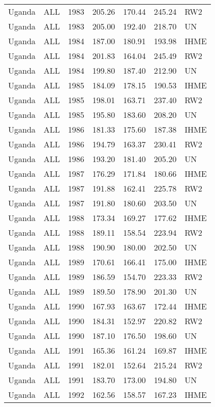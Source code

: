 \begin{longtable}{lllrrrl}
  Uganda & ALL & 1983 & 205.26 & 170.44 & 245.24 & RW2 \\ 
  Uganda & ALL & 1983 & 205.00 & 192.40 & 218.70 & UN \\ 
  Uganda & ALL & 1984 & 187.00 & 180.91 & 193.98 & IHME \\ 
  Uganda & ALL & 1984 & 201.83 & 164.04 & 245.49 & RW2 \\ 
  Uganda & ALL & 1984 & 199.80 & 187.40 & 212.90 & UN \\ 
  Uganda & ALL & 1985 & 184.09 & 178.15 & 190.53 & IHME \\ 
  Uganda & ALL & 1985 & 198.01 & 163.71 & 237.40 & RW2 \\ 
  Uganda & ALL & 1985 & 195.80 & 183.60 & 208.20 & UN \\ 
  Uganda & ALL & 1986 & 181.33 & 175.60 & 187.38 & IHME \\ 
  Uganda & ALL & 1986 & 194.79 & 163.37 & 230.41 & RW2 \\ 
  Uganda & ALL & 1986 & 193.20 & 181.40 & 205.20 & UN \\ 
  Uganda & ALL & 1987 & 176.29 & 171.84 & 180.66 & IHME \\ 
  Uganda & ALL & 1987 & 191.88 & 162.41 & 225.78 & RW2 \\ 
  Uganda & ALL & 1987 & 191.80 & 180.60 & 203.50 & UN \\ 
  Uganda & ALL & 1988 & 173.34 & 169.27 & 177.62 & IHME \\ 
  Uganda & ALL & 1988 & 189.11 & 158.54 & 223.94 & RW2 \\ 
  Uganda & ALL & 1988 & 190.90 & 180.00 & 202.50 & UN \\ 
  Uganda & ALL & 1989 & 170.61 & 166.41 & 175.00 & IHME \\ 
  Uganda & ALL & 1989 & 186.59 & 154.70 & 223.33 & RW2 \\ 
  Uganda & ALL & 1989 & 189.50 & 178.90 & 201.30 & UN \\ 
  Uganda & ALL & 1990 & 167.93 & 163.67 & 172.44 & IHME \\ 
  Uganda & ALL & 1990 & 184.31 & 152.97 & 220.82 & RW2 \\ 
  Uganda & ALL & 1990 & 187.10 & 176.50 & 198.60 & UN \\ 
  Uganda & ALL & 1991 & 165.36 & 161.24 & 169.87 & IHME \\ 
  Uganda & ALL & 1991 & 182.01 & 152.64 & 215.24 & RW2 \\ 
  Uganda & ALL & 1991 & 183.70 & 173.00 & 194.80 & UN \\ 
  Uganda & ALL & 1992 & 162.56 & 158.57 & 167.23 & IHME \\ 

\end{longtable}

